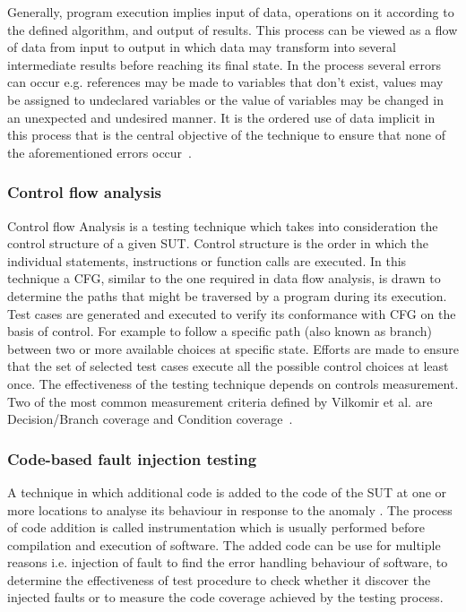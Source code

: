 Generally, program execution implies input of data, operations on it according to the defined algorithm, and output of results. This process can be viewed as a flow of data from input to output in which data may transform into several intermediate results before reaching its final state. In the process several errors can occur e.g. references may be made to variables that don’t exist, values may be assigned to undeclared variables or the value of variables may be changed in an unexpected and undesired manner. It is the ordered use of data implicit in this process that is the central objective of the technique to ensure that none of the aforementioned errors occur~\cite{fosdick1976data}.

\subsubsection{Control flow analysis}
Control flow Analysis is a testing technique which takes into consideration the control structure of a given SUT. Control structure is the order in which the individual statements, instructions or function calls are executed. In this technique a CFG, similar to the one required in data flow analysis, is drawn to determine the paths that might be traversed by a program during its execution. Test cases are generated and executed to verify its conformance with CFG on the basis of control. For example to follow a specific path (also known as branch) between two or more available choices at specific state. Efforts are made to ensure that the set of selected test cases execute all the possible control choices at least once. The effectiveness of the testing technique depends on controls measurement. Two of the most common measurement criteria defined by Vilkomir et al. are Decision/Branch coverage and Condition coverage~\cite{vilkomir2003tolerance}. 

\subsubsection{Code-based fault injection testing}
A technique in which additional code is added to the code of the SUT at one or more locations to analyse its behaviour in response to the anomaly \cite{voas1997software}. The process of code addition is called instrumentation which is usually performed before compilation and execution of software. The added code can be use for multiple reasons i.e. injection of fault to find the error handling behaviour of software, to determine the effectiveness of test procedure to check whether it discover the injected faults or to measure the code coverage achieved by the testing process.    

